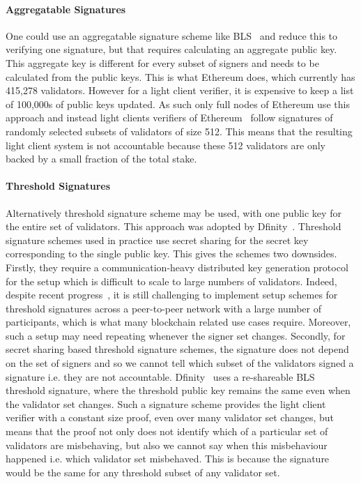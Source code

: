 \paragraph{Aggregatable Signatures} One could use an aggregatable signature scheme like BLS~\cite{BLS_signatures,boneh_compact_multisig}  and reduce this to verifying one signature, but that requires calculating an aggregate public key. This aggregate key is different for every subset of signers and needs to be calculated from the public keys. This is what Ethereum 
does, which currently has 415,278 validators. %
However for a light client verifier, it is expensive to keep a list of 100,000s of public keys updated. As such only full nodes of Ethereum use this approach and instead light clients verifiers of Ethereum~\cite{sync_committee} follow signatures of randomly selected subsets of validators of size 512. This means that the resulting light client system is not accountable because these 512 validators are only backed by a small fraction of the total stake.

\paragraph{Threshold Signatures} Alternatively threshold signature scheme may be used, with one public key for the entire set of validators. This approach was adopted by Dfinity~\cite{GrothDKG}. Threshold signature schemes used in practice use secret sharing for the secret key corresponding to the single public key. This gives the schemes two downsides. Firstly, they require a communication-heavy distributed key generation protocol for the setup which is difficult to scale to large numbers of validators. Indeed, despite recent progress~\cite{AggregatableDKG,GrothDKG,LWEDKG}, it is still challenging to implement setup schemes for threshold signatures across a peer-to-peer network with a large number of participants, which is what many blockchain related use cases require. Moreover, such a setup may need repeating whenever the signer set changes. Secondly, for secret sharing based threshold signature schemes, the signature does not depend on the set of signers and so we cannot tell which subset of the validators signed a signature i.e. they are not accountable. Dfinity~\cite{GrothDKG} uses a re-shareable BLS threshold signature, where the threshold public key remains the same even when the validator set changes. Such a signature scheme 
provides the light client verifier with a constant size proof, even over many validator set changes, but means that the proof not only does not identify which of a particular set of validators are misbehaving, but also we cannot say when this misbehaviour happened i.e. which validator set misbehaved. This is because the signature would be the same for any threshold subset of any validator set.


